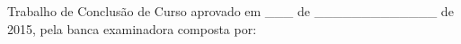 \documentclass[
	12pt,				%
	openright,			%
	oneside,			%
	a4paper,			%
	english,			%
	french,				%
	spanish,			%
	brazil,				%
	oldfontcommands
	]{abntex2}
\begin{document}



%
% 
%
\begin{folhadeaprovacao}

  \begin{center}
    {\ABNTEXchapterfont\large\imprimirautor}

    \vspace*{\fill}\vspace*{\fill}
    \begin{center}
      \ABNTEXchapterfont\bfseries\Large\imprimirtitulo
    \end{center}
    \vspace*{\fill}
    
    \hspace{.45\textwidth}
    \begin{minipage}{.5\textwidth}
    \end{minipage}%
    \vspace*{\fill}
   \end{center}
        
Trabalho de Conclusão de Curso aprovado em \_\_\_ de \_\_\_\_\_\_\_\_\_\_\_\_\_ de 2015, pela banca examinadora composta por: 

      
   \begin{center}
    \vspace*{0.5cm}
    {\large\imprimirlocal}
    \par
    {\large\imprimirdata}
    \vspace*{1cm}
  \end{center}
  
\end{folhadeaprovacao}
\end{document}
